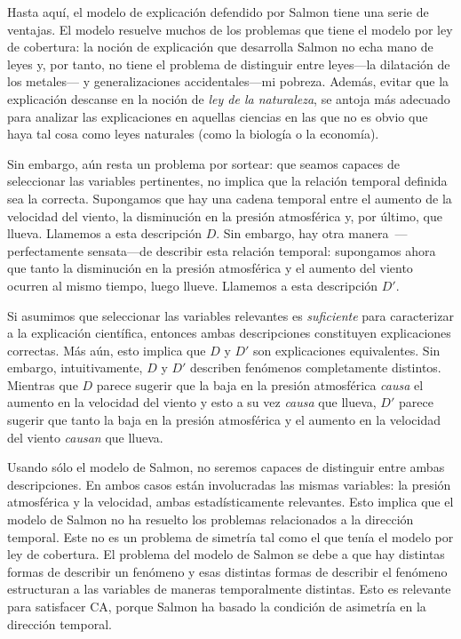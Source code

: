 Hasta aquí, el modelo de explicación defendido por Salmon
tiene una serie de ventajas. El modelo resuelve muchos de
los problemas que tiene el modelo por ley de cobertura: la
noción de explicación que desarrolla Salmon no echa mano de
leyes y, por tanto, no tiene el problema de distinguir entre
leyes---la dilatación de los metales--- y generalizaciones
accidentales---mi pobreza. Además, evitar que la
explicación descanse en la noción de \emph{ley de la
naturaleza}, se antoja más adecuado para analizar las
explicaciones en aquellas ciencias en las que no es obvio
que haya tal cosa como leyes naturales (como la biología o la economía).

Sin embargo, aún resta un problema por sortear: que seamos
capaces de seleccionar las variables pertinentes, no implica
que la relación temporal definida sea la correcta.
Supongamos que hay una cadena temporal entre el aumento de
la velocidad del viento, la disminución en la presión
atmosférica y, por último, que llueva. Llamemos a esta
descripción $ D $. Sin embargo, hay otra
manera~---perfectamente sensata---de describir esta relación
temporal: supongamos ahora que tanto la disminución en la
presión atmosférica y el aumento del viento ocurren al mismo
tiempo, luego llueve. Llamemos a esta descripción $ D' $.

Si asumimos que seleccionar las variables relevantes es
\emph{suficiente} para caracterizar a la explicación
científica, entonces ambas descripciones constituyen
explicaciones correctas. Más aún, esto implica que $ D  $ y
$  D' $ son explicaciones equivalentes. Sin embargo,
intuitivamente, $ D $ y $ D' $ describen fenómenos
completamente distintos. Mientras que $ D $ parece sugerir
que la baja en la presión atmosférica \emph{causa} el
aumento en la velocidad del viento y esto a su vez
\emph{causa} que llueva, $ D' $ parece sugerir que tanto la
baja en la presión atmosférica y el aumento en la velocidad
del viento \emph{causan} que llueva.

Usando sólo el modelo de Salmon, no seremos capaces de
distinguir entre ambas descripciones. En ambos casos están
involucradas las mismas variables: la presión atmosférica y
la velocidad, ambas estadísticamente relevantes.
Esto implica que el modelo de Salmon no ha resuelto los
problemas relacionados a la dirección
temporal. Este no es un problema de simetría tal como el que
tenía el modelo por ley de cobertura. El problema del
modelo de Salmon se debe a que hay distintas formas de
describir un fenómeno y esas distintas formas de describir
el fenómeno estructuran a las variables de maneras
temporalmente distintas. Esto es relevante para satisfacer
CA, porque Salmon ha basado la condición de asimetría en la dirección temporal.



